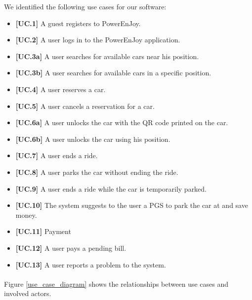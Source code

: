 \documentclass[english]{article}
\begin{document}
We identified the following use cases for our software:
	\begin{itemize}
		\item{\textbf{[UC.1]} A guest registers to PowerEnJoy.}
		\item{\textbf{[UC.2]} A user logs in to the PowerEnJoy application.}
		\item{\textbf{[UC.3a]} A user searches for available cars near his position.}
		\item{\textbf{[UC.3b]} A user searches for available cars in a specific position.}
		\item{\textbf{[UC.4]} A user reserves a car.}
		\item{\textbf{[UC.5]} A user cancels a reservation for a car.}
		\item{\textbf{[UC.6a]} A user unlocks the car with the QR code printed on the car.}
		\item{\textbf{[UC.6b]} A user unlocks the car using his position.}
		\item{\textbf{[UC.7]} A user ends a ride.}
		\item{\textbf{[UC.8]} A user parks the car without ending the ride.}
		\item{\textbf{[UC.9]} A user ends a ride while the car is temporarily parked.}
		\item{\textbf{[UC.10]} The system suggests to the user a PGS to park the car at and save money.}
		\item{\textbf{[UC.11]} Payment}
		\item{\textbf{[UC.12]} A user pays a pending bill.}
		\item{\textbf{[UC.13]} A user reports a problem to the system.}
	\end{itemize}
	
\paragraph{}
Figure \ref{use_case_diagram} shows the relationships between use cases and involved actors.
\end{document}
